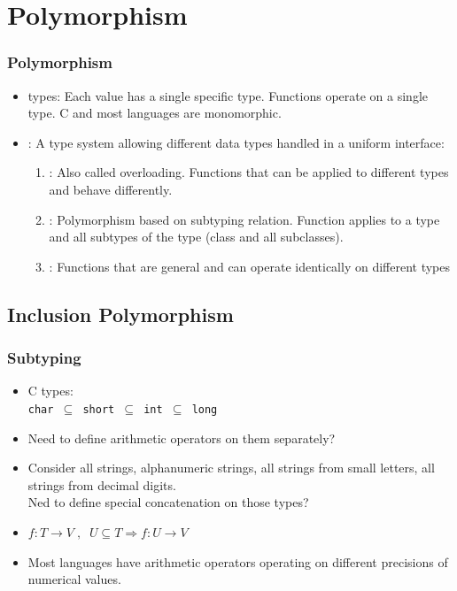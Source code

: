 \section{Polymorphism}
\begin{frame}
\frametitle{Polymorphism}
\begin{itemize}[<+->]
  \item {} types: Each value has a single specific type. Functions operate
  on a single type. C and most languages are monomorphic.
  \item {}: A type system allowing different data
  types handled in a uniform interface:
  \begin{enumerate}
  \item {}: Also called overloading. Functions that
  can be applied to different types and behave differently.
  \item {}: Polymorphism based on subtyping
  relation. Function applies to a type and all subtypes of the type (class
  and all subclasses).
  \item {}: Functions that are general
  and can operate identically on different types
  \end{enumerate}
\end{itemize}
\end{frame}

\subsection{Inclusion Polymorphism}
\begin{frame}
\frametitle{Subtyping}
\begin{itemize}
\item C types:\\
	\texttt{char $\subseteq$ short $\subseteq$ int $\subseteq$ long}
\item Need to define arithmetic operators on them separately?
\item Consider  all strings, alphanumeric strings, all strings
	from small letters, all strings from decimal digits.\\
	Ned to define special concatenation on those types?
\item $f: T \rightarrow V \;,\;\; U \subseteq T \Rightarrow
	f: U \rightarrow V$
\item Most languages have arithmetic operators  operating on different
precisions of numerical values.
\end{itemize}
\end{frame}

